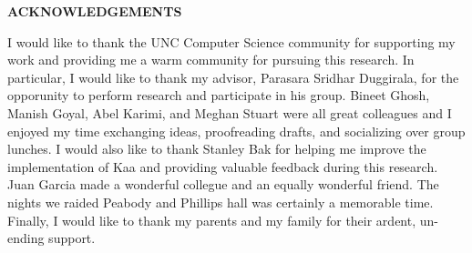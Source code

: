 
\begin{center}
\vspace*{52pt}
{\Large \textbf{ACKNOWLEDGEMENTS}}
\end{center}

I would like to thank the UNC Computer Science community for supporting my work and providing me a warm community for pursuing this research. In particular, I would like to thank my advisor, Parasara Sridhar Duggirala, for the opporunity to perform research and participate in his group.
%
%
Bineet Ghosh, Manish Goyal, Abel Karimi, and Meghan Stuart were all great colleagues and I enjoyed my time exchanging ideas, proofreading drafts, and socializing over group lunches. I would also like to thank Stanley Bak for helping me improve the implementation of Kaa and providing valuable feedback during this research. Juan Garcia made a wonderful collegue and an equally wonderful friend. The nights we raided Peabody and Phillips hall was certainly a memorable time. Finally, I would like to thank my parents and my family for their ardent, un-ending support.

\clearpage
